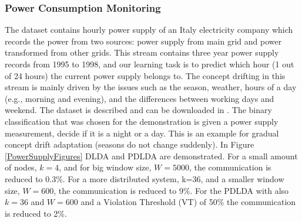 \documentclass[11pt,twocolumn,varwidth=true,a4paper,fleqn]{article}
\begin{document}
\subsubsection{Power Consumption Monitoring}
The dataset contains hourly power supply of an Italy electricity company which
records the power from two sources: power supply from main grid and power 
transformed from other grids. This stream contains three year power supply records 
from 1995 to 1998, and our learning task is to predict which hour (1 out of 24 hours) the 
current power supply belongs to. The concept drifting in this stream is mainly 
driven by the issues such as the season, weather, hours of a day (e.g., morning 
and evening), and the differences between working days and weekend.  
The dataset is described and can be downloaded in \cite{powerSupply}.
The binary classification that was chosen for the demonstration is given a power
supply measurement, decide if it is a night or a day. This is an
example for gradual concept drift adaptation (seasons do not change suddenly).
In Figure \ref{PowerSupplyFigures} DLDA and PDLDA are demonstrated. For a small 
amount of nodes, $k=4$, and for big window size, $W=5000$, the communication is
reduced to 0.3\%. For a more distributed system, k=36, and a smaller window
size, $W=600$, the communication is reduced to 9\%. For the PDLDA with also
$k=36$ and $W=600$ and a Violation Threshold (VT) of 50\% the communication is
reduced to 2\%.
\end{document}
